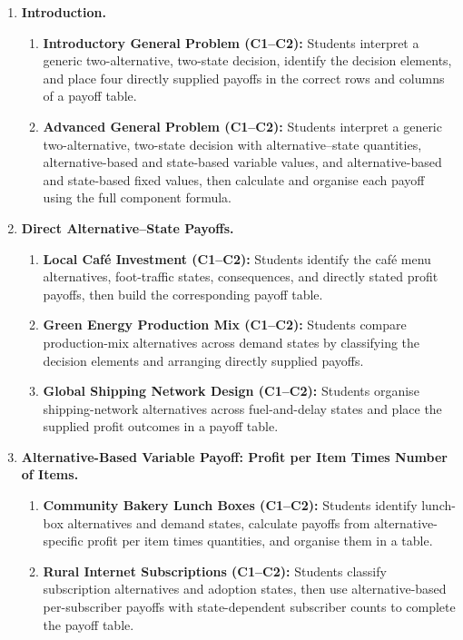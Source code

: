 	\begin{enumerate}
		\item \textbf{Introduction.}
		\begin{enumerate}
			\item \textbf{Introductory General Problem (C1--C2):} Students interpret a generic two-alternative, two-state decision, identify the decision elements, and place four directly supplied payoffs in the correct rows and columns of a payoff table.
			\item \textbf{Advanced General Problem (C1--C2):} Students interpret a generic two-alternative, two-state decision with alternative--state quantities, alternative-based and state-based variable values, and alternative-based and state-based fixed values, then calculate and organise each payoff using the full component formula.
		\end{enumerate}

		\item \textbf{Direct Alternative--State Payoffs.}
		\begin{enumerate}
			\item \textbf{Local Café Investment (C1--C2):} Students identify the café menu alternatives, foot-traffic states, consequences, and directly stated profit payoffs, then build the corresponding payoff table.
			\item \textbf{Green Energy Production Mix (C1--C2):} Students compare production-mix alternatives across demand states by classifying the decision elements and arranging directly supplied payoffs.
			\item \textbf{Global Shipping Network Design (C1--C2):} Students organise shipping-network alternatives across fuel-and-delay states and place the supplied profit outcomes in a payoff table.
		\end{enumerate}

		\item \textbf{Alternative-Based Variable Payoff: Profit per Item Times Number of Items.}
		\begin{enumerate}
			\item \textbf{Community Bakery Lunch Boxes (C1--C2):} Students identify lunch-box alternatives and demand states, calculate payoffs from alternative-specific profit per item times quantities, and organise them in a table.
			\item \textbf{Rural Internet Subscriptions (C1--C2):} Students classify subscription alternatives and adoption states, then use alternative-based per-subscriber payoffs with state-dependent subscriber counts to complete the payoff table.
		\end{enumerate}


\end{enumerate}
